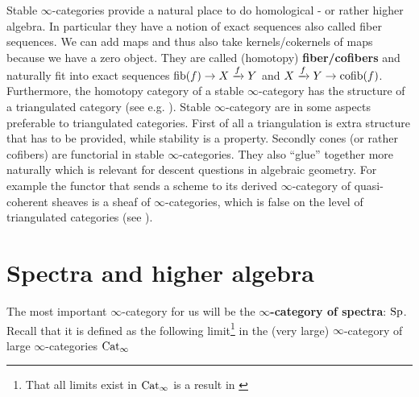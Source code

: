 \begin{itemize}
    Stable $\infty$-categories provide a natural place to do homological - or rather higher algebra. In particular they have a notion of exact sequences also called fiber sequences. We can add maps and thus also take kernels/cokernels of maps because we have a zero object. 
    They are called (homotopy) \textbf{fiber/cofibers} and naturally fit into exact sequences $\operatorname{fib}(f)\rightarrow X\xrightarrow{f} Y$ and $X\xrightarrow{f} Y\rightarrow \operatorname{cofib}(f)$. Furthermore, the homotopy category of a stable $\infty$-category has the structure of a triangulated category (see e.g. \cite[Theorem~1.1.2.14]{lurie2017higher}). Stable $\infty$-category are in some aspects preferable to triangulated categories.
    First of all a triangulation is extra structure that has to be provided, while stability is a property. Secondly cones (or rather cofibers) are functorial in stable $\infty$-categories. 
    They also ``glue'' together more naturally which is relevant for descent questions in algebraic geometry. For example the functor that sends a scheme to its derived $\infty$-category of quasi-coherent sheaves is a sheaf of $\infty$-categories, which is false on the level of triangulated categories (see \cite[Chapter~3]{GRastudyindag}).
    
\end{itemize}
\section{Spectra and higher algebra}\label{higheralg}
The most important $\infty$-category for us will be the\textbf{ $\infty$-category of spectra}: $\operatorname{Sp}$. Recall that it is defined as the following limit\footnote{That all limits exist in $\operatorname{Cat}_\infty$ is a result in \cite[Section~3.3.3]{HigherToposTheory}} in the (very large) $\infty$-category of large $\infty$-categories $\operatorname{Cat}_\infty$

